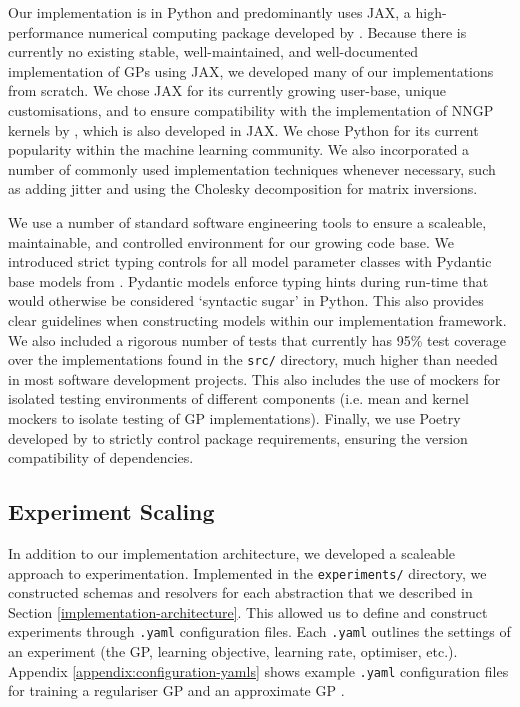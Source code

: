 \documentclass{article}
\def\code#1{\texttt{#1}}
\numberwithin{equation}{section}
\begin{document}
Our implementation is in Python and predominantly uses JAX, a high-performance numerical computing package developed by \cite{jax2018github}.
Because there is currently no existing stable, well-maintained, and well-documented implementation of GPs using JAX, we developed many of our implementations from scratch.
We chose JAX for its currently growing user-base, unique customisations, and to ensure compatibility with the implementation of NNGP kernels by \cite{novak2019neural}, which is also developed in JAX.
We chose Python for its current popularity within the machine learning community.
We also incorporated a number of commonly used implementation techniques whenever necessary, such as adding jitter and using the Cholesky decomposition for matrix inversions.

We use a number of standard software engineering tools to ensure a scaleable, maintainable, and controlled environment for our growing code base.
We introduced strict typing controls for all model parameter classes with Pydantic base models from \cite{samuel_colvin_2023_8277473}.
Pydantic models enforce typing hints during run-time that would otherwise be considered `syntactic sugar' in Python. This also provides clear guidelines when constructing models within our implementation framework.
We also included a rigorous number of tests that currently has 95\% test coverage over the implementations found in the \code{src/} directory, much higher than needed in most software development projects.
This also includes the use of mockers for isolated testing environments of different components (i.e. mean and kernel mockers to isolate testing of GP implementations). 
Finally, we use Poetry developed by \cite{Eustace} to strictly control package requirements, ensuring the version compatibility of dependencies.

\subsection{Experiment Scaling}
In addition to our implementation architecture, we developed a scaleable approach to experimentation.
Implemented in the \code{experiments/} directory, we constructed schemas and resolvers for each abstraction that we described in Section \ref{implementation-architecture}.
This allowed us to define and construct experiments through \code{.yaml} configuration files.
Each \code{.yaml} outlines the settings of an experiment (the GP, learning objective, learning rate, optimiser, etc.).
Appendix \ref{appendix:configuration-yamls} shows example \code{.yaml} configuration files for training a regulariser GP and an approximate GP .
\end{document}
